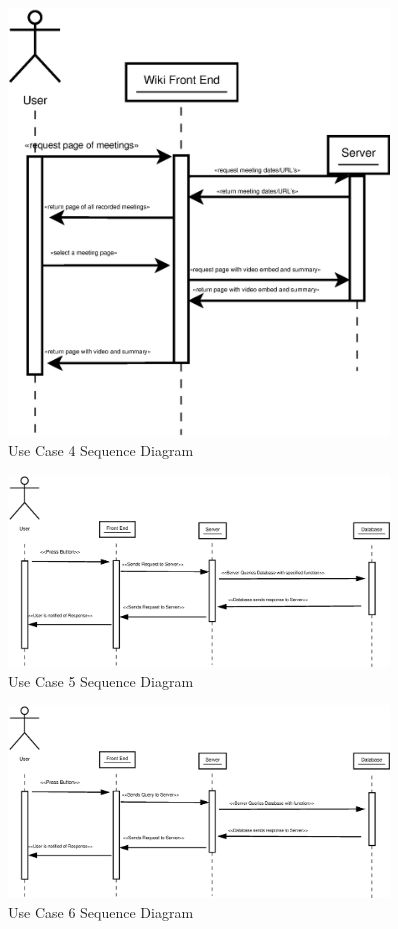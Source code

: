 \documentclass[a4paper, 10pt, oneside, draft]{article}
\begin{document}
\begin{figure}[p]
    \centering
    \includegraphics[width=0.9\textwidth]{Use_Case_4}
    \caption{Use Case 4 Sequence Diagram}
    \label{fig:usecase4_image}
\end{figure}

\begin{figure}[p]
    \centering
    \includegraphics[width=0.9\textwidth]{Use_Case_5}
    \caption{Use Case 5 Sequence Diagram}
    \label{fig:usecase5_image}
\end{figure}

\begin{figure}[p]
    \centering
    \includegraphics[width=0.9\textwidth]{Use_Case_6}
    \caption{Use Case 6 Sequence Diagram}
    \label{fig:usecase6_image}
\end{figure}
\end{document}
